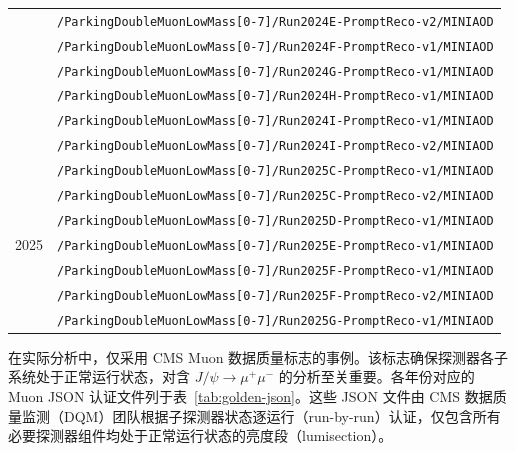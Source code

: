 \begin{table}[htbp]
\begin{tabular}{cl}
                          & \texttt{/ParkingDoubleMuonLowMass[0-7]/Run2024E-PromptReco-v2/MINIAOD} \\
                          & \texttt{/ParkingDoubleMuonLowMass[0-7]/Run2024F-PromptReco-v1/MINIAOD} \\
                          & \texttt{/ParkingDoubleMuonLowMass[0-7]/Run2024G-PromptReco-v1/MINIAOD} \\
                          & \texttt{/ParkingDoubleMuonLowMass[0-7]/Run2024H-PromptReco-v1/MINIAOD} \\
                          & \texttt{/ParkingDoubleMuonLowMass[0-7]/Run2024I-PromptReco-v1/MINIAOD} \\
                          & \texttt{/ParkingDoubleMuonLowMass[0-7]/Run2024I-PromptReco-v2/MINIAOD} \\
    \midrule
    \multirow{7}{*}{2025} & \texttt{/ParkingDoubleMuonLowMass[0-7]/Run2025C-PromptReco-v1/MINIAOD} \\
                         & \texttt{/ParkingDoubleMuonLowMass[0-7]/Run2025C-PromptReco-v2/MINIAOD} \\
                         & \texttt{/ParkingDoubleMuonLowMass[0-7]/Run2025D-PromptReco-v1/MINIAOD} \\
                         & \texttt{/ParkingDoubleMuonLowMass[0-7]/Run2025E-PromptReco-v1/MINIAOD} \\
                         & \texttt{/ParkingDoubleMuonLowMass[0-7]/Run2025F-PromptReco-v1/MINIAOD} \\
                         & \texttt{/ParkingDoubleMuonLowMass[0-7]/Run2025F-PromptReco-v2/MINIAOD} \\
                         & \texttt{/ParkingDoubleMuonLowMass[0-7]/Run2025G-PromptReco-v1/MINIAOD} \\
    \bottomrule
  \end{tabular}
\end{table}

在实际分析中，仅采用 CMS Muon 数据质量标志的事例。该标志确保探测器各子系统处于正常运行状态，对含 $J/\psi \to \mu^+\mu^-$ 的分析至关重要。各年份对应的 Muon JSON 认证文件列于表~\ref{tab:golden-json}。这些 JSON 文件由 CMS 数据质量监测（DQM）团队根据子探测器状态逐运行（run-by-run）认证，仅包含所有必要探测器组件均处于正常运行状态的亮度段（lumisection）。

